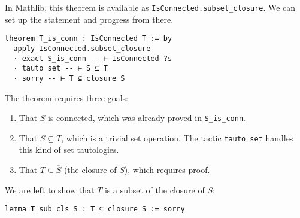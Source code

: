 In Mathlib, this theorem is available as
\lstinline[language=lean]|IsConnected.subset_closure|.
We can set up the statement and progress from there.
\begin{lstlisting}[language=lean]
theorem T_is_conn : IsConnected T := by
  apply IsConnected.subset_closure
  · exact S_is_conn -- ⊢ IsConnected ?s
  · tauto_set -- ⊢ S ⊆ T
  · sorry -- ⊢ T ⊆ closure S
\end{lstlisting}

The theorem requires three goals:
\begin{enumerate}
  \item That $S$ is connected, which was already proved in \lstinline[language=lean]|S_is_conn|.
  \item That $S \subseteq T$, which is a trivial set operation.
        The tactic \lstinline[language=lean]|tauto_set| handles this kind of set tautologies.
  \item That $T \subseteq \overline{S}$ (the closure of $S$), which requires proof.
\end{enumerate}

We are left to show that $T$ is a subset of the closure of $S$:
\begin{lstlisting}[language=lean]
lemma T_sub_cls_S : T ⊆ closure S := sorry
\end{lstlisting}

